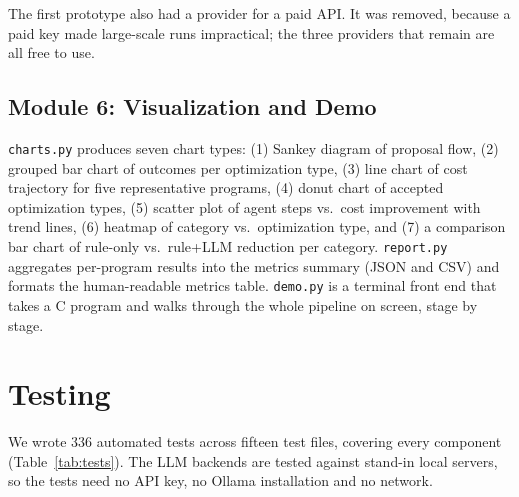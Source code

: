 \documentclass[12pt,a4paper]{report}
\begin{document}
The first prototype also had a provider for a paid API. It was removed, because a paid key made large-scale runs impractical; the three providers that remain are all free to use.

\subsection{Module 6: Visualization and Demo}

\texttt{charts.py} produces seven chart types: (1) Sankey diagram of proposal flow, (2) grouped bar chart of outcomes per optimization type, (3) line chart of cost trajectory for five representative programs, (4) donut chart of accepted optimization types, (5) scatter plot of agent steps vs.\ cost improvement with trend lines, (6) heatmap of category vs.\ optimization type, and (7) a comparison bar chart of rule-only vs.\ rule+LLM reduction per category. \texttt{report.py} aggregates per-program results into the metrics summary (JSON and CSV) and formats the human-readable metrics table. \texttt{demo.py} is a terminal front end that takes a C program and walks through the whole pipeline on screen, stage by stage.

\section{Testing}
\label{sec:testing}

We wrote 336 automated tests across fifteen test files, covering every component (Table~\ref{tab:tests}). The LLM backends are tested against stand-in local servers, so the tests need no API key, no Ollama installation and no network.
\end{document}
